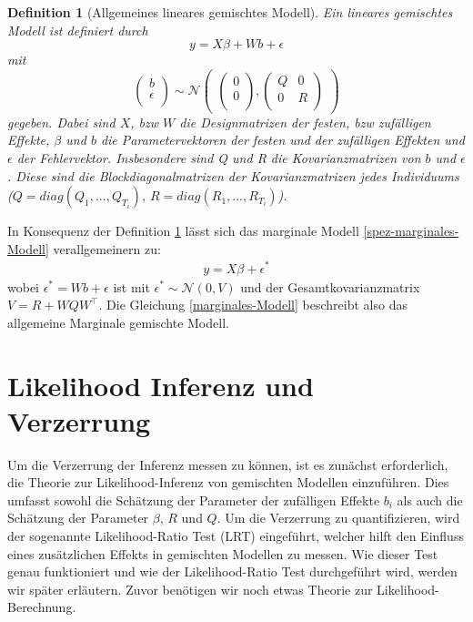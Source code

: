 \documentclass[%
thesis=student,%
coverpage=false,%
titlepage=false,%
headmarks=true, %
german,%
font=libertine, %
math=newpxtx, %
BCOR=5mm,%
coverBCOR=11mm%
]{tumbook}
\theoremstyle{break}
\newtheorem{definition}{Definition}[section]
\begin{document}
\begin{definition}[Allgemeines lineares gemischtes Modell]
	Ein lineares gemischtes Modell ist definiert durch
	$$y = X\beta + Wb + \epsilon $$
	mit $$\begin{pmatrix}
		b \\
		\epsilon \\
	\end{pmatrix}
	\sim
	\mathcal{N}
	\begin{pmatrix}
		\begin{pmatrix}
			
			0 \\
			0 \\
		\end{pmatrix},
		\begin{pmatrix}
			Q & 0 \\
			0 & R  \\
		\end{pmatrix}
	\end{pmatrix}$$
	gegeben. Dabei sind $X$, bzw $W$ die Designmatrizen der festen, bzw zufälligen Effekte, $\beta$ und $b$ die Parametervektoren der festen und der zufälligen Effekten und $\epsilon$ der Fehlervektor. Insbesondere sind Q und R die Kovarianzmatrizen von $b$ und $\epsilon$. Diese sind die Blockdiagonalmatrizen der Kovarianzmatrizen jedes Individuums ($Q=diag(Q_1,...,Q_{T_i})$, $R=diag(R_1,...,R_{T_i})$).
	\label{def:allg-lin-gem-Modell}
\end{definition}\noindent
In Konsequenz der Definition \ref{def:allg-lin-gem-Modell} lässt sich das marginale Modell \ref{spez-marginales-Modell} verallgemeinern zu: 
\begin{align}	
	y = X\beta + \epsilon^* \label{marginales-Modell}
\end{align}
wobei $\epsilon^* = Wb + \epsilon$ ist mit $\epsilon^* \sim \mathcal{N}(0,V)$ und der Gesamtkovarianzmatrix $V= R + WQW^{\top}$. Die Gleichung \ref{marginales-Modell} beschreibt also das allgemeine Marginale gemischte Modell.


\section{Likelihood Inferenz und Verzerrung}
Um die Verzerrung der Inferenz messen zu können, ist es zunächst erforderlich, die Theorie zur Likelihood-Inferenz von gemischten Modellen einzuführen. Dies umfasst sowohl die Schätzung der Parameter der zufälligen Effekte $b_i$ als auch die Schätzung der Parameter $\beta$, $R$ und $Q$. Um die Verzerrung zu quantifizieren, wird der sogenannte Likelihood-Ratio Test (LRT) eingeführt, welcher hilft den Einfluss eines zusätzlichen Effekts in gemischten Modellen zu messen.
Wie dieser Test genau funktioniert und wie der Likelihood-Ratio Test durchgeführt wird, werden wir später erläutern. Zuvor benötigen wir noch etwas Theorie zur Likelihood-Berechnung.
\end{document}
